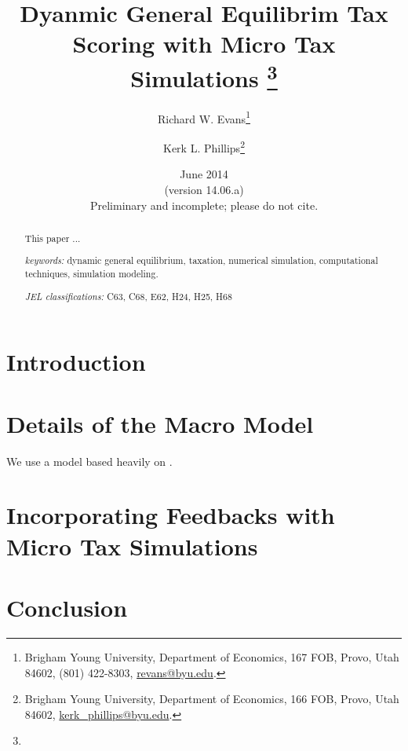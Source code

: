 \documentclass[letterpaper,12pt]{article}
\theoremstyle{definition}
\numberwithin{equation}{section}
\begin{document}
\begin{titlepage}
  \title{Dyanmic General Equilibrim Tax Scoring with Micro Tax Simulations
         \thanks{} }

  \author{ Richard W. Evans\footnote{Brigham Young University, Department of Economics, 167 FOB, Provo, Utah 84602, (801) 422-8303, \href{mailto:revans@byu.edu}{revans@byu.edu}.} \\[-2pt]
         \and
         Kerk L. Phillips\footnote{Brigham Young University, Department of Economics, 166 FOB, Provo, Utah 84602, \href{mailto:kerk_phillips@byu.edu}{kerk\_phillips@byu.edu}.} \\[-2pt]}
  \date{June 2014 \\
        \scriptsize{(version 14.06.a)}\\
        \small Preliminary and incomplete; please do not cite.}
  \maketitle
  \begin{abstract}
  \small{This paper ...

  \vspace{0.3in}

  \textit{keywords:} dynamic general equilibrium, taxation, numerical simulation, computational techniques, simulation modeling.

  \vspace{0.3in}

  \textit{JEL classifications:} C63, C68, E62, H24, H25, H68}
  \end{abstract}
  \thispagestyle{empty}
\end{titlepage}

\begin{spacing}{1.5}


\section{Introduction}\label{SecIntro}

\section{Details of the Macro Model}\label{SecMacro}

We use a model based heavily on \citet{ZodrowDiamond:2013}.

\section{Incorporating Feedbacks with Micro Tax Simulations}\label{SecMicro}

\section{Conclusion}\label{SecConclusion}


\end{spacing}
\end{document}
